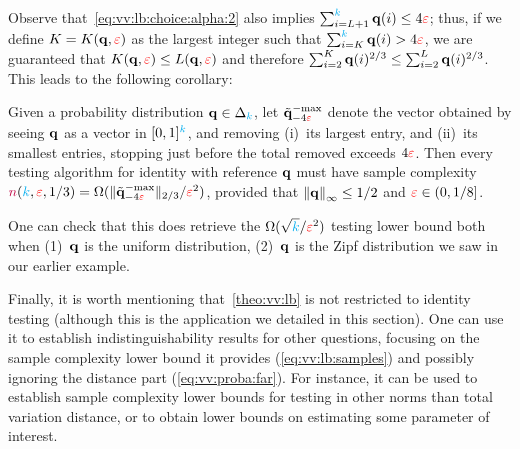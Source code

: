 Observe that~\cref{eq:vv:lb:choice:alpha:2} also implies $\sum_{i=L+1}^{\textcolor{cyan}{k}} \mathbf{q}(i) \leq 4\textcolor{red}{\varepsilon}$; thus, if we define $K=K(\mathbf{q},\textcolor{red}{\varepsilon})$ as the largest integer such that $\sum_{i=K}^{\textcolor{cyan}{k}} \mathbf{q}(i) > 4\textcolor{red}{\varepsilon}$, we are guaranteed that $K(\mathbf{q},\textcolor{red}{\varepsilon})\leq L(\mathbf{q},\textcolor{red}{\varepsilon})$ and therefore $\sum_{i=2}^K \mathbf{q}(i)^{2/3} \leq \sum_{i=2}^L \mathbf{q}(i)^{2/3}$. This leads to the following corollary:
\begin{theorem}
  \label{theo:2/3:lb:vv}
Given a probability distribution $\mathbf{q}\in\Delta_{{\textcolor{cyan}{k}}}$, let $\tilde{\mathbf{q}}^{-\!\max}_{-4\textcolor{red}{\varepsilon}}$ denote the vector obtained by seeing $\mathbf{q}$ as a vector in $[0,1]^{\textcolor{cyan}{k}}$, and removing (i)~its largest entry, and (ii)~its smallest entries, stopping just before the total removed exceeds $4\textcolor{red}{\varepsilon}$. Then every testing algorithm for identity with reference $\mathbf{q}$ must have sample complexity ${\textcolor{purple}{n}}({\textcolor{cyan}{k}},\textcolor{red}{\varepsilon},1/3) = \Omega(\lVert\tilde{\mathbf{q}}^{-\!\max}_{-4\textcolor{red}{\varepsilon}}\rVert_{2/3}/\textcolor{red}{\varepsilon}^2)$, provided that $\norminf{\q}\leq 1/2$ and $\textcolor{red}{\varepsilon}\in(0,1/8]$.
\end{theorem}
\noindent One can check that this does retrieve the $\Omega(\sqrt{{\textcolor{cyan}{k}}}/\textcolor{red}{\varepsilon}^2)$ testing lower bound both when (1)~$\mathbf{q}$ is the uniform distribution, (2)~$\mathbf{q}$ is the Zipf  distribution we saw in our earlier example\medskip.


Finally, it is worth mentioning that~\cref{theo:vv:lb} is not restricted to identity testing (although this is the application we detailed in this section). One can use it to establish indistinguishability results for other questions, focusing on the sample complexity lower bound it provides (\cref{eq:vv:lb:samples}) and possibly ignoring the distance part (\cref{eq:vv:proba:far}). For instance, it can be used to establish sample complexity lower bounds for testing in other norms than total variation distance, or to obtain lower bounds on estimating some parameter of interest.

